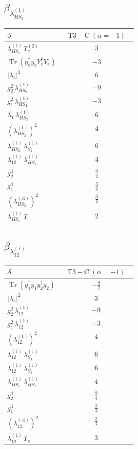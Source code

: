 \documentclass[9pt]{article}
\begin{document}
\subsection*{$ \beta_{\lambda_{HS_2}^{(1)}} $}
\begin{longtable}{@{}p{0.31\linewidth}c@{}}
\toprule
$\mathcal{S}$ & $ \mathrm{T3-C}\;(\alpha=-1) $ \\
\midrule
$ \lambda_{HS_2}^{(1)}\,T_{\nu}^{(2)} $ & $ 3 $ \\
$ \operatorname{Tr}(y_2^\dagger y_2Y_e^\dagger Y_e) $ & $ -3 $ \\
$ |\lambda_5|^2 $ & $ 6 $ \\
$ g_2^2\,\lambda_{HS_2}^{(1)} $ & $ -9 $ \\
$ g_1^2\,\lambda_{HS_2}^{(1)} $ & $ -3 $ \\
$ \lambda_1\,\lambda_{HS_2}^{(1)} $ & $ 6 $ \\
$ \left(\lambda_{HS_2}^{(1)}\right)^2 $ & $ 4 $ \\
$ \lambda_{HS_2}^{(1)}\,\lambda_{S_2}^{(1)} $ & $ 6 $ \\
$ \lambda_{12}^{(1)}\,\lambda_{HS_1}^{(1)} $ & $ 4 $ \\
$ g_2^4 $ & $ \frac{9}{4} $ \\
$ g_1^4 $ & $ \frac{3}{4} $ \\
$ \left(\lambda_{HS_2}^{(A)}\right)^2 $ & $ \frac{3}{4} $ \\
$ \lambda_{HS_2}^{(1)}\,T $ & $ 2 $ \\
\bottomrule
\end{longtable}
\subsection*{$ \beta_{\lambda_{12}^{(1)}} $}
\begin{longtable}{@{}p{0.31\linewidth}c@{}}
\toprule
$\mathcal{S}$ & $ \mathrm{T3-C}\;(\alpha=-1) $ \\
\midrule
$ \operatorname{Tr}(y_1^\dagger y_1y_2^\dagger y_2) $ & $ - \frac{9}{2} $ \\
$ |\lambda_5|^2 $ & $ 3 $ \\
$ g_2^2\,\lambda_{12}^{(1)} $ & $ -9 $ \\
$ g_1^2\,\lambda_{12}^{(1)} $ & $ -3 $ \\
$ \left(\lambda_{12}^{(1)}\right)^2 $ & $ 4 $ \\
$ \lambda_{12}^{(1)}\,\lambda_{S_1}^{(1)} $ & $ 6 $ \\
$ \lambda_{12}^{(1)}\,\lambda_{S_2}^{(1)} $ & $ 6 $ \\
$ \lambda_{HS_1}^{(1)}\,\lambda_{HS_2}^{(1)} $ & $ 4 $ \\
$ g_2^4 $ & $ \frac{9}{4} $ \\
$ g_1^4 $ & $ \frac{3}{4} $ \\
$ \left(\lambda_{12}^{(A)}\right)^2 $ & $ \frac{3}{4} $ \\
$ \lambda_{12}^{(1)}\,T_\nu $ & $ 3 $ \\
\bottomrule
\end{longtable}
\end{document}
